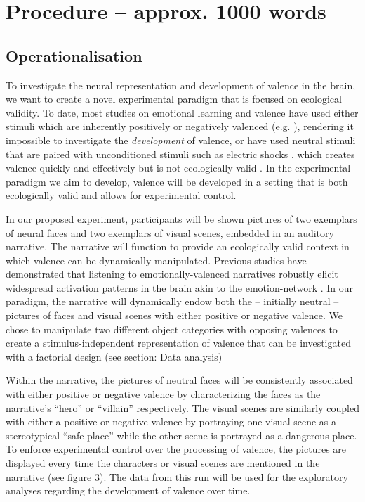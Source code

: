 \documentclass[12pt,a4paper]{article}\usepackage[]{graphicx}\usepackage[]{color}
\begin{document}
\noindent
\wordcount 

\section{Procedure \textmd{– approx. 1000 words}}
\subsection{Operationalisation}
To investigate the neural representation and development of valence in the brain, we want to create a novel experimental paradigm that is focused on ecological validity. To date, most studies on emotional learning and valence have used either stimuli which are inherently positively or negatively valenced (e.g. \citealp{baucom2012,aldhafeeri2012}), rendering it impossible to investigate the \emph{development} of valence, or have used neutral stimuli that are paired with unconditioned stimuli such as electric shocks \citep{visser2013}, which creates valence quickly and effectively but is not ecologically valid \citep{spiers2007}. In the experimental paradigm we aim to develop, valence will be developed in a setting that is both ecologically valid and allows for experimental control. 

In our proposed experiment, participants will be shown pictures of two exemplars of neural faces and two exemplars of visual scenes, embedded in an auditory narrative. The narrative will function to provide an ecologically valid context in which valence can be dynamically manipulated. Previous studies have demonstrated that listening to emotionally-valenced narratives robustly elicit widespread activation patterns in the brain \citep{nijhof2015,mar2011} akin to the emotion-network \citep{sabatinelli2006}. In our paradigm, the narrative will dynamically endow both the -- initially neutral -- pictures of faces and visual scenes with either positive or negative valence. We chose to manipulate two different object categories with opposing valences to create a stimulus-independent representation of valence that can be investigated with a factorial design (see section: Data analysis)

Within the narrative, the pictures of neutral faces will be consistently associated with either positive or negative valence by characterizing the faces as the narrative's ``hero'' or ``villain'' respectively. The visual scenes are similarly coupled with either a positive or negative valence by portraying one visual scene as a stereotypical ``safe place'' while the other scene is portrayed as a dangerous place. To enforce experimental control over the processing of valence, the pictures are displayed every time the characters or visual scenes are mentioned in the narrative (see figure 3). The data from this run will be used for the exploratory analyses regarding the development of valence over time.
\end{document}
